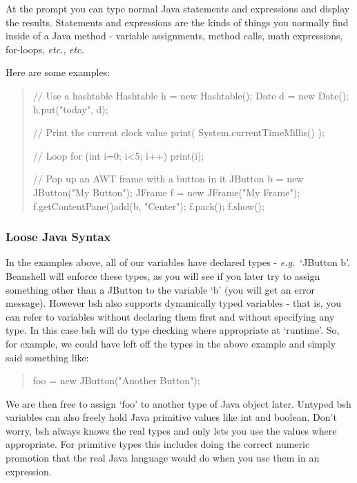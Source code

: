 \documentclass[twoside,11pt,nolof]{starlink}
\providecommand{\eg}{\textit{e.g.}}
\providecommand{\etc}{\textit{etc.}}
\begin{document}
At the prompt you can type normal Java statements and expressions and
display the results.
Statements and expressions are the kinds of things you normally find
inside of a Java method - variable assignments, method calls, math
expressions, for-loops, \etc, \etc

Here are some examples:
\begin{quote}
\begin{terminalv}
    // Use a hashtable
    Hashtable h = new Hashtable();
    Date d = new Date();
    h.put("today", d);

    // Print the current clock value
    print( System.currentTimeMillis() );

    // Loop
    for (int i=0; i<5; i++)
        print(i);

    // Pop up an AWT frame with a button in it
    JButton b = new JButton("My Button");
    JFrame f = new JFrame("My Frame");
    f.getContentPane()add(b, "Center");
    f.pack();
    f.show();
\end{terminalv}
\end{quote}

\subsubsection{Loose Java Syntax}

In the examples above, all of our variables have declared types -
\eg\ `JButton b'.  Beanshell will enforce these types, as you will see if
you later try to assign something other than a JButton to the variable
`b' (you will get an error message).  However bsh also supports
dynamically typed variables - that is, you can refer to variables
without declaring them first and without specifying any type.  In this
case bsh will do type checking where appropriate at `runtime'.  So,
for example, we could have left off the types in the above example and
simply said something like:
\begin{quote}
\begin{terminalv}
    foo = new JButton("Another Button");
\end{terminalv}
\end{quote}

We are then free to assign `foo' to another type of Java object later.
Untyped bsh variables can also freely hold Java primitive values like int
and boolean.  Don't worry, bsh always knows the real types and only lets you
use the values where appropriate.  For primitive types this includes doing the
correct numeric promotion that the real Java language would do when you use
them in an expression.
\end{document}
